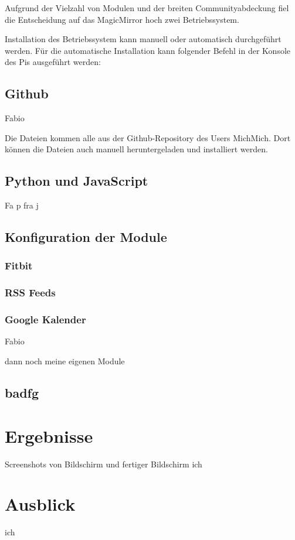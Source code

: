 \documentclass[12pt,a4paper]{report}
\begin{document}
Aufgrund der Vielzahl von Modulen und der breiten Communityabdeckung fiel die Entscheidung auf das MagicMirror hoch zwei Betriebssystem. 


Installation des Betriebssystem kann manuell oder automatisch durchgeführt werden. 
Für die automatische Installation kann folgender Befehl in der Konsole des Pis ausgeführt werden:

\section{Github}

Fabio


Die Dateien kommen alle aus der Github-Repository des Users MichMich. Dort können die Dateien auch manuell heruntergeladen und installiert werden. 
\section{Python und JavaScript}
Fa p fra j
\section{Konfiguration der Module}
\subsection{Fitbit}
\subsection{RSS Feeds}
\subsection{Google Kalender}
Fabio

dann noch meine eigenen Module
\section{badfg}






\chapter{Ergebnisse}
Screenshots von Bildschirm und fertiger Bildschirm
ich
\chapter{Ausblick}
ich
\end{document}
